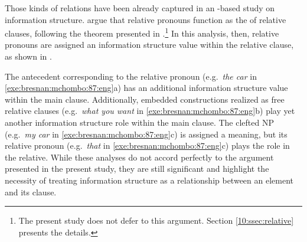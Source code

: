 Those kinds of relations have been already captured in an
-based study on information structure. \citet{bresnan:mchombo:87} argue that
relative pronouns function as the  of relative clauses,
following the theorem presented in \citet{kuno:76}.\footnote{The
  present study does not defer to this
  argument. Section \ref{10:ssec:relative} presents the details.}  In this
analysis, then, relative pronouns are assigned an information
structure value within the relative clause, as shown in
.




\noindent The antecedent corresponding to the relative pronoun
(e.g.\ \textit{the car} in \ref{exe:bresnan:mchombo:87:eng}a) has an
additional information structure value within the main
clause. Additionally,
embedded constructions realized as free relative clauses
(e.g.\ \textit{what you want} in \ref{exe:bresnan:mchombo:87:eng}b)
play yet another information structure role within the main
clause. The clefted NP (e.g.\ \textit{my car} in
\ref{exe:bresnan:mchombo:87:eng}c) is assigned a 
meaning, but its relative pronoun (e.g.\ \textit{that} in
\ref{exe:bresnan:mchombo:87:eng}c) plays the  role in the
relative.  While these analyses do not accord perfectly to the
argument presented in the present study, they are still significant
and highlight the necessity of treating information structure as a
relationship between an element and its clause.



